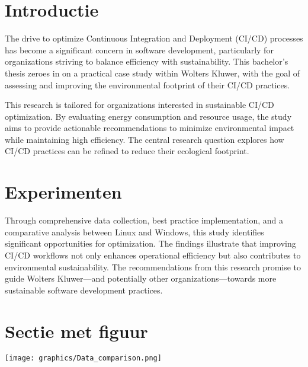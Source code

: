\documentclass[a0,portrait]{hogent-poster}
\begin{document}
\begin{multicols}{2} %

\section{Introductie}

The drive to optimize Continuous Integration and Deployment (CI/CD) processes has become a significant concern in software development, particularly for organizations striving to balance efficiency with sustainability. This bachelor's thesis zeroes in on a practical case study within Wolters Kluwer, with the goal of assessing and improving the environmental footprint of their CI/CD practices.

This research is tailored for organizations interested in sustainable CI/CD optimization. By evaluating energy consumption and resource usage, the study aims to provide actionable recommendations to minimize environmental impact while maintaining high efficiency. The central research question explores how CI/CD practices can be refined to reduce their ecological footprint.

\section{Experimenten}
Through comprehensive data collection, best practice implementation, and a comparative analysis between Linux and Windows, this study identifies significant opportunities for optimization. The findings illustrate that improving CI/CD workflows not only enhances operational efficiency but also contributes to environmental sustainability. The recommendations from this research promise to guide Wolters Kluwer—and potentially other organizations—towards more sustainable software development practices.

\section{Sectie met figuur}


\begin{center}
  \captionsetup{type=figure}
  \texttt{[image: graphics/Data\_comparison.png]}
\end{center}


\end{multicols}
\end{document}
